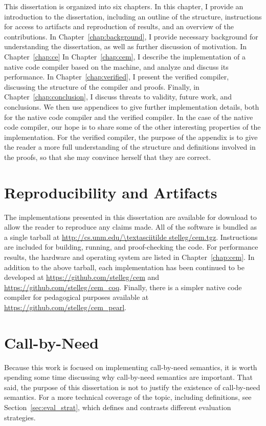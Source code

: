 This dissertation is organized into six chapters. In this chapter, I provide
an introduction to the dissertation, including an outline of the structure,
instructions for access to artifacts and reproduction of results, and an
overview of the contributions. In Chapter~\ref{chap:background}, I provide
necessary background for understanding the dissertation, as well as further
discussion of motivation. In Chapter~\ref{chap:ce}  In Chapter~\ref{chap:cem},
I describe the implementation of a native code compiler based on the \ce
machine, and analyze and discuss its performance. In
Chapter~\ref{chap:verified}, I present the verified compiler, discussing the
structure of the compiler and proofs. Finally, in Chapter~\ref{chap:conclusion},
I discuss threats to validity, future work, and conclusions. We then use
appendices to give further implementation details, both for the native code
compiler and the verified compiler. In the case of the native code compiler, our
hope is to share some of the other interesting properties of the implementation.
For the verified compiler, the purpose of the appendix is to give the reader a
more full understanding of the structure and definitions involved in the proofs,
so that she may convince herself that they are correct.

\section{Reproducibility and Artifacts}

The implementations presented in this dissertation are available for download to
allow the reader to reproduce any claims made. All of the software is bundled as
a single tarball at \url{http://cs.unm.edu/\textasciitilde stelleg/cem.tgz}.
Instructions are included for building, running, and proof-checking the code.
For performance results, the hardware and operating system are listed in
Chapter~\ref{chap:cem}. In addition to the above tarball, each implementation has been
continued to be developed at \url{https://github.com/stelleg/cem} and
\url{https://github.com/stelleg/cem\_coq}. Finally, there is a simpler native
code compiler for pedagogical purposes available at
\url{https://github.com/stelleg/cem\_pearl}. 

\section{Call-by-Need}

Because this work is focused on implementing call-by-need semantics, it is worth
spending some time discussing why call-by-need semantics are important. That
said, the purpose of this dissertation is not to justify the existence of
call-by-need semantics. For a more technical coverage of the topic, including
definitions, see Section~\ref{sec:eval_strat}, which defines and contrasts
different evaluation strategies.

